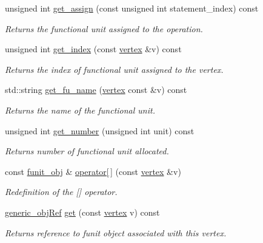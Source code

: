 \begin{DoxyCompactItemize}
unsigned int \hyperlink{classfu__binding_af9092917389748eb9d98bd7eac24a116}{get\+\_\+assign} (const unsigned int statement\+\_\+index) const
\begin{DoxyCompactList}\small\item\em Returns the functional unit assigned to the operation. \end{DoxyCompactList}\item 
unsigned int \hyperlink{classfu__binding_aaf7a77c359203fa9866bc452550891e5}{get\+\_\+index} (const \hyperlink{graph_8hpp_abefdcf0544e601805af44eca032cca14}{vertex} \&v) const
\begin{DoxyCompactList}\small\item\em Returns the index of functional unit assigned to the vertex. \end{DoxyCompactList}\item 
std\+::string \hyperlink{classfu__binding_a92729622430342e6827ecb5398a71379}{get\+\_\+fu\+\_\+name} (\hyperlink{graph_8hpp_abefdcf0544e601805af44eca032cca14}{vertex} const \&v) const
\begin{DoxyCompactList}\small\item\em Returns the name of the functional unit. \end{DoxyCompactList}\item 
unsigned int \hyperlink{classfu__binding_ae55092e8c48ea5924dfd46ea56141ff8}{get\+\_\+number} (unsigned int unit) const
\begin{DoxyCompactList}\small\item\em Returns number of functional unit allocated. \end{DoxyCompactList}\item 
const \hyperlink{classfunit__obj}{funit\+\_\+obj} \& \hyperlink{classfu__binding_a51f3555cae82ec4eabe7c2ad3d21475a}{operator\mbox{[}$\,$\mbox{]}} (const \hyperlink{graph_8hpp_abefdcf0544e601805af44eca032cca14}{vertex} \&v)
\begin{DoxyCompactList}\small\item\em Redefinition of the \mbox{[}\mbox{]} operator. \end{DoxyCompactList}\item 
\hyperlink{generic__obj_8hpp_acb533b2ef8e0fe72e09a04d20904ca81}{generic\+\_\+obj\+Ref} \hyperlink{classfu__binding_afbc918cf6838696e8c4f0373ccac09ac}{get} (const \hyperlink{graph_8hpp_abefdcf0544e601805af44eca032cca14}{vertex} v) const
\begin{DoxyCompactList}\small\item\em Returns reference to funit object associated with this vertex. \end{DoxyCompactList}\item 

\end{DoxyCompactItemize}

